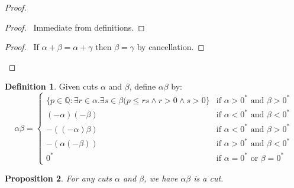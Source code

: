 \documentclass{book}
\let\qed\relax
\newtheorem{prop}{Proposition}[chapter]
\theoremstyle{definition}
\newtheorem{df}[prop]{Definition}
\begin{document}
\begin{proof}
\pf
{}
\begin{proof}
	\pf\ Immediate from definitions.
\end{proof}
\begin{proof}
	\pf\ If $\alpha + \beta = \alpha + \gamma$ then $\beta = \gamma$ by cancellation.
\end{proof}
\qed
\end{proof}

\begin{df}
Given cuts $\alpha$ and $\beta$, define $\alpha \beta$ by:
\[ \alpha \beta = \begin{cases}
\{ p \in \mathbb{Q} : \exists r \in \alpha. \exists s \in \beta (p \leq rs \wedge r > 0 \wedge s > 0 \} & \text{if } \alpha > 0^* \text{ and } \beta > 0^* \\
(-\alpha)(-\beta) & \text{if } \alpha < 0^* \text{ and } \beta < 0^* \\
-((-\alpha)\beta) & \text{if } \alpha < 0^* \text{ and } \beta > 0^* \\
-(\alpha(-\beta)) & \text{if } \alpha > 0^* \text{ and } \beta < 0^* \\
0^* & \text{if } \alpha = 0^* \text{ or } \beta = 0^*
\end{cases} \]
\end{df}

\begin{prop}
For any cuts $\alpha$ and $\beta$, we have $\alpha \beta$ is a cut.
\end{prop}
\end{document}
